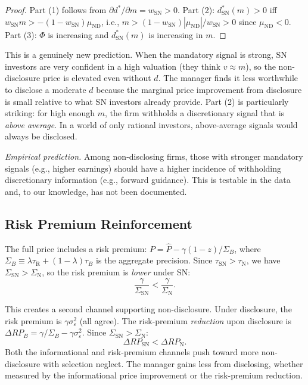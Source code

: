 \documentclass[12pt]{article}
\theoremstyle{plain}
\theoremstyle{definition}
\newcommand{\ND}{\mathrm{ND}}
\newcommand{\R}{\mathrm{R}}
\newcommand{\SN}{\mathrm{SN}}
\newcommand{\N}{\mathrm{N}}
\begin{document}
\begin{proof}
Part (1) follows from $\partial d^*/\partial m = w_\SN > 0$. Part (2): $d^*_\SN(m) > 0$ iff $w_\SN m > -(1-w_\SN)\mu_{\ND}$, i.e., $m > (1-w_\SN)|\mu_{\ND}|/w_\SN > 0$ since $\mu_{\ND} < 0$. Part (3): $\Phi$ is increasing and $d^*_\SN(m)$ is increasing in $m$.
\end{proof}

This is a genuinely new prediction. When the mandatory signal is strong, SN investors are very confident in a high valuation (they think $v \approx m$), so the non-disclosure price is elevated even without $d$. The manager finds it less worthwhile to disclose a moderate $d$ because the marginal price improvement from disclosure is small relative to what SN investors already provide. Part (2) is particularly striking: for high enough $m$, the firm withholds a discretionary signal that is \emph{above average}. In a world of only rational investors, above-average signals would always be disclosed.

\emph{Empirical prediction.} Among non-disclosing firms, those with stronger mandatory signals (e.g., higher earnings) should have a higher incidence of withholding discretionary information (e.g., forward guidance). This is testable in the data and, to our knowledge, has not been documented.


\subsection{Risk Premium Reinforcement}
\label{sec:risk_premium}

The full price includes a risk premium: $P = \hat{P} - \gamma(1-z)/\Sigma_B$, where $\Sigma_B \equiv \lambda\tau_\R + (1-\lambda)\tau_B$ is the aggregate precision. Since $\tau_\SN > \tau_\N$, we have $\Sigma_\SN > \Sigma_\N$, so the risk premium is \emph{lower} under SN:
\begin{equation}
\frac{\gamma}{\Sigma_\SN} < \frac{\gamma}{\Sigma_\N}.
\end{equation}

This creates a second channel supporting non-disclosure. Under disclosure, the risk premium is $\gamma\sigma_\varepsilon^2$ (all agree). The risk-premium \emph{reduction} upon disclosure is $\Delta RP_B = \gamma/\Sigma_B - \gamma\sigma_\varepsilon^2$. Since $\Sigma_\SN > \Sigma_\N$:
\[
\Delta RP_\SN < \Delta RP_\N.
\]
Both the informational and risk-premium channels push toward more non-disclosure with selection neglect. The manager gains less from disclosing, whether measured by the informational price improvement or the risk-premium reduction.
\end{document}
